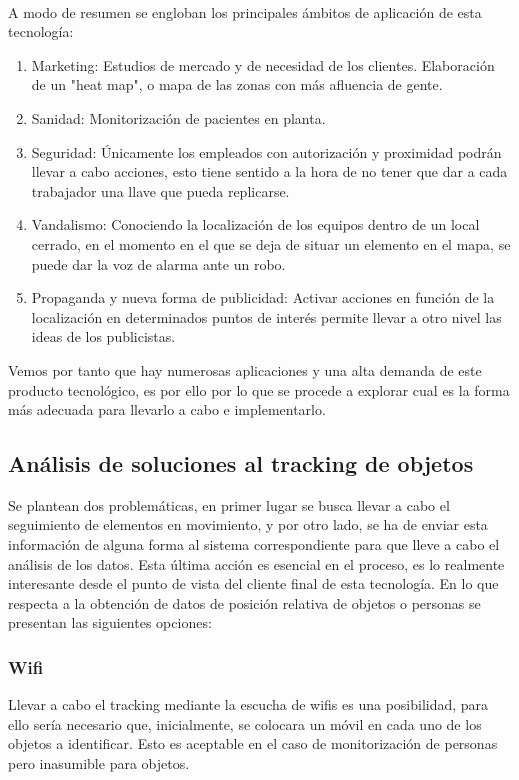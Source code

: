 \documentclass[paper=a4, fontsize=11pt,twoside]{scrartcl}	%
\begin{document}
        \paragraph{}
        A modo de resumen se engloban los principales ámbitos de aplicación de esta tecnología:
        \begin{enumerate}
            \item Marketing: Estudios de mercado y de necesidad de los clientes. Elaboración de un "heat map", o mapa 
            de las zonas con más afluencia de gente.
            \item Sanidad: Monitorización de pacientes en planta. 
            \item Seguridad: Únicamente los empleados con autorización y proximidad podrán llevar a cabo acciones,
            esto tiene sentido a la hora de no tener que dar a cada trabajador una llave que pueda replicarse.
            \item Vandalismo: Conociendo la localización de los equipos dentro de un local cerrado, en el momento 
            en el que se deja de situar un elemento en el mapa, se puede dar la voz de alarma ante un robo.
            \item Propaganda y nueva forma de publicidad: Activar acciones en función de la localización en determinados
            puntos de interés permite llevar a otro nivel las ideas de los publicistas.
        \end{enumerate}
        Vemos por tanto que hay numerosas aplicaciones y una alta demanda de este producto tecnológico, es por ello por lo que se 
        procede a explorar cual es la forma más adecuada para llevarlo a cabo e implementarlo.
    \subsection{Análisis de soluciones al tracking de objetos}
        Se plantean dos problemáticas, en primer lugar se busca llevar a cabo el seguimiento de elementos en movimiento, y por otro lado, 
        se ha de enviar esta información de alguna forma al sistema correspondiente para que lleve a cabo el análisis de los datos. Esta
        última acción es esencial en el proceso, es lo realmente interesante desde el punto de vista del cliente final de esta tecnología.
        En lo que respecta a la obtención de datos de posición relativa de objetos o personas se presentan las siguientes opciones:
        \subsubsection {Wifi}
            Llevar a cabo el tracking mediante la escucha de wifis es una posibilidad, para ello sería
            necesario que, inicialmente, se colocara un móvil en cada uno de los objetos a identificar. Esto es aceptable 
            en el caso de monitorización de personas pero inasumible para objetos.
\end{document}
